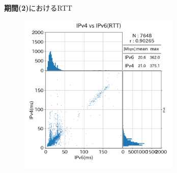 \begin{figure}[htbp]
\begin{center}
\begin{subfigure}[b]{0.49\textwidth}
            \label{new_diffISP_rtt}
        \end{subfigure}
        \caption{{\bf 期間(2)}におけるRTT}
        \label{fig:new_isp_rtt}
    \end{center}
\end{figure}
\FloatBarrier

\begin{figure}[htbp]
    \begin{center}
        \begin{minipage}[t]{0.48\textwidth}
            \begin{center}
                \begin{subfigure}[b]{\textwidth}
                    \centering
                    \includegraphics[width=0.85\textwidth]{fig/old_FTTH_rtt.png}
                    \label{old_FTTH_rtt}
                \end{subfigure}
                \begin{subfigure}[b]{\textwidth}
                    \centering

\end{subfigure}
\end{center}
\end{minipage}
\end{center}
\end{figure}
